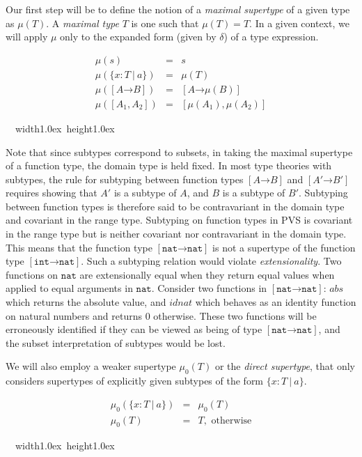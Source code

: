 \documentclass [12pt,twoside]{cslreport}
\newcommand{\thmbox}
   {{\ \hfill\hbox{%
      \vrule width1.0ex height1.0ex
   }\parfillskip 0pt }}
\newcommand{\aro}{\mathord\rightarrow} %
\newcommand{\funtype}[2]{[#1 \aro #2]}
\newcommand{\tupletype}[1]{[#1]}
\newcommand{\listwo}[2]{#1_{1}, #1_{2}}
\newcommand{\ttint}{\mathtt{int}}
\newcommand{\ttnat}{\mathtt{nat}}
\newcommand{\vbar}{\ |\ }
\newenvironment{Defn}[1]{\begin{definition}[#1]\label{defn:#1}}{
\thmbox\end{definition}}
\begin{document}
Our first step will be to define the notion of a \emph{maximal supertype}
of a given type as $\mu(T)$.  A \emph{maximal type} $T$ is one such that
$\mu(T) = T$.  In a given context, we will apply  $\mu$ only to the
expanded form (given by $\delta$) of a type expression.  
\begin{Defn}{maximal supertype}
\begin{eqnarray*}
  \mu(s) & = & s \\
   \mu(\{x : T \vbar a\}) & = & \mu(T) \\
%
   \mu(\funtype{A}{B}) & = & \funtype{A}{\mu(B)} \\
  \mu(\tupletype{\listwo{A}{n}}) & = & \tupletype{\mu(A_1), \mu(A_2)}
\end{eqnarray*}
\end{Defn}
Note that since subtypes correspond to subsets, in taking the maximal
supertype of a function type, the domain type is held fixed.  In most type
theories with subtypes, the rule for subtyping between function types
$\funtype{A}{B}$ and $\funtype{A'}{B'}$ requires showing that $A'$ is a
subtype of $A$, and $B$ is a subtype of $B'$\@.  Subtyping between
function types is therefore said to be contravariant in the domain type
and covariant in the range type.  Subtyping on function types in PVS is
covariant in the range type but is neither covariant nor contravariant in
the domain type.  This means that the function type
$\funtype{\ttnat}{\ttnat}$ is not a supertype of the function type
$\funtype{\ttint}{\ttnat}$\@.  Such a subtyping relation would violate
{\em extensionality\/}\@.  Two functions on $\ttnat$ are extensionally
equal when they return equal values when applied to equal arguments in
$\ttnat$\@.  Consider two functions in $\funtype{\ttnat}{\ttnat}$:
$\mathit{abs}$ which returns the absolute value, and $\mathit{idnat}$
which behaves as an identity function on natural numbers and returns $0$
otherwise.  These two functions will be erroneously identified if they can
be viewed as being of type $\funtype{\ttnat}{\ttnat}$, and the subset
interpretation of subtypes would be lost.

We will also employ a weaker supertype $\mu_0(T)$ or the
{\em direct supertype\/}, that only considers supertypes of
explicitly given subtypes of the form $\{x : T \vbar a\}$.
\begin{Defn}{direct supertype}
\begin{eqnarray*}
\mu_0(\{x : T \vbar a\}) & = & \mu_0(T)\\
\mu_0(T) & = & T, \mbox{ otherwise}
\end{eqnarray*}
\end{Defn}
\end{document}
